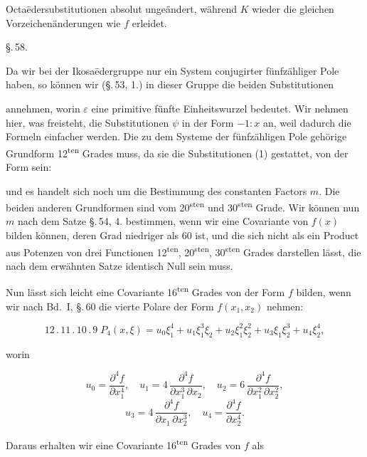 Octa\"edersubstitutionen absolut unge\"andert, w\"ahrend $K$ wieder
die gleichen Vorzeichen\"anderungen wie $f$ erleidet.

\begin{center}
\S.\,58.

\end{center}

Da wir bei der Ikosa\"edergruppe nur ein System conjugirter
f\"unfz\"ahliger Pole haben, so k\"onnen wir (\S.\,53, 1.) in dieser Gruppe
die beiden Substitutionen


annehmen, worin $\varepsilon$ eine primitive f\"unfte Einheitswurzel bedeutet.
Wir nehmen hier, was freisteht, die Substitutionen $\psi$ in der
Form $-1:x$ an, weil dadurch die Formeln einfacher werden.
Die zu dem Systeme der f\"unfz\"ahligen Pole geh\"orige Grundform
12\textsuperscript{ten} Grades muss, da sie die Substitutionen (1) gestattet, von
der Form sein:


und es handelt sich noch um die Bestimmung des constanten
Factors $m$. Die beiden anderen Grundformen sind vom 20\textsuperscript{sten}
und 30\textsuperscript{sten} Grade. Wir k\"onnen nun $m$ nach dem Satze \S.\,54, 4.
bestimmen, wenn wir eine Covariante von $f(x)$ bilden k\"onnen,
deren Grad niedriger als 60 ist, und die sich nicht als ein Product
 aus Potenzen von drei Functionen 12\textsuperscript{ten}, 20\textsuperscript{sten}, 30\textsuperscript{sten}
Grades darstellen l\"asst, die nach dem erw\"ahnten Satze identisch
Null sein muss.

Nun l\"asst sich leicht eine Covariante 16\textsuperscript{ten} Grades von der
Form $f$ bilden, wenn wir nach Bd.\ I, \S.\,60 die vierte Polare der
Form $f(x_1,x_2)$ nehmen:

\[
12\,.\,11\,.\,10\,.\,9\;P_4(x,\xi) = u_0\xi_1^4 + u_1\xi_1^3\xi_2 + u_2\xi_1^2\xi_2^2 + u_3\xi_1\xi_2^3 + u_4\xi_2^4,
\]

worin

\[
u_0 = \frac{\partial^4 f}{\partial x_1^4}, \quad u_1 = 4\,\frac{\partial^4 f}{\partial x_1^3\,\partial x_2}, \quad u_2 = 6\,\frac{\partial^4 f}{\partial x_1^2\,\partial x_2^2},
\]
\[
u_3 = 4\,\frac{\partial^4 f}{\partial x_1\,\partial x_2^3}, \quad u_4 = \frac{\partial^4 f}{\partial x_2^4}.
\]

Daraus erhalten wir eine Covariante 16\textsuperscript{ten} Grades von $f$ als
